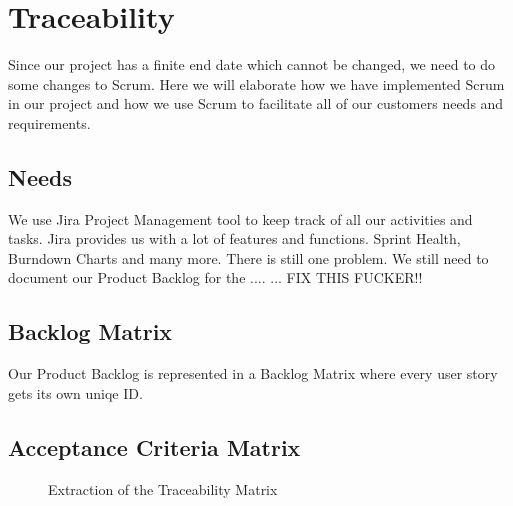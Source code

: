 \section{Traceability}
Since our project has a finite end date which cannot be changed, we need to do some changes to Scrum. Here we will elaborate how we have implemented Scrum in our project and how we use Scrum to facilitate all of our customers needs and requirements.

\subsection{Needs}
We use Jira Project Management tool to keep track of all our activities and tasks. Jira provides us with a lot of features and functions. Sprint Health, Burndown Charts and many more. There is still one problem. We still need to document our Product Backlog for the .... ... FIX THIS FUCKER!! 

\subsection{Backlog Matrix}
Our Product Backlog is represented in a Backlog Matrix where every user story gets its own uniqe ID. 

\subsection{Acceptance Criteria Matrix}




\begin{figure}[h]
    \centering
        \caption{Extraction of the Traceability Matrix}
        \label{fig:test}
\end{figure}
